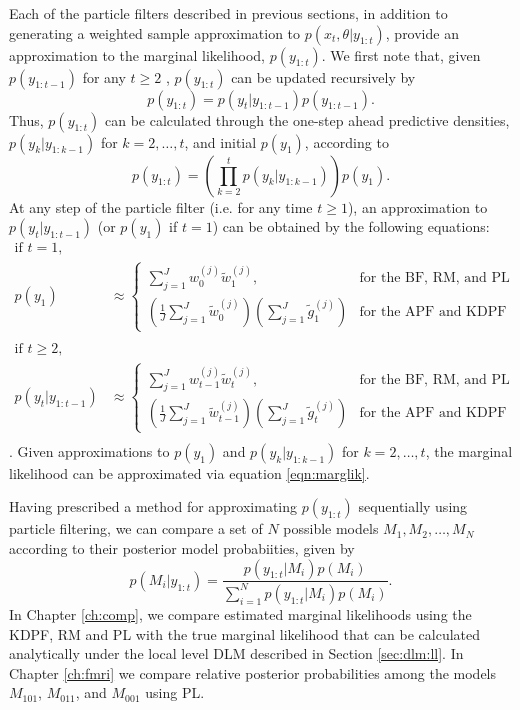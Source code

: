 Each of the particle filters described in previous sections, in addition to generating a weighted sample approximation to $p(x_t,\theta|y_{1:t})$, provide an approximation to the marginal likelihood, $p(y_{1:t})$. We first note that, given $p(y_{1:t-1})$ for any $t \ge 2$ , $p(y_{1:t})$ can be updated recursively by
\begin{equation}
p(y_{1:t}) = p(y_t|y_{1:t-1})p(y_{1:t-1}). \label{eqn:marglik:recurse}
\end{equation}
Thus, $p(y_{1:t})$ can be calculated through the one-step ahead predictive densities, $p(y_k|y_{1:k-1})$ for $k=2,\ldots,t$, and initial $p(y_1)$, according to
\begin{equation}
p(y_{1:t}) = \left(\prod_{k=2}^t p(y_k|y_{1:k-1})\right)p(y_1). \label{eqn:marglik}
\end{equation}
At any step of the particle filter (i.e. for any time $t \ge 1$), an approximation to $p(y_t|y_{1:t-1})$ (or $p(y_1)$ if $t = 1$) can be obtained by the following equations:
\begin{align}
\mbox{if } t = 1, & \nonumber \\
p(y_1) &\approx \left\{\begin{array}{ll} \sum_{j=1}^J w^{(j)}_{0}\tilde{w}^{(j)}_1, & \mbox{for the BF, RM, and PL} \\ \left(\frac{1}{J}\sum_{j=1}^J \tilde{w}^{(j)}_{0}\right)\left(\sum_{j=1}^J\tilde{g}^{(j)}_1\right) & \mbox{for the APF and KDPF} \end{array} \right. \label{eqn:onestep:pf:init} \\
 & \nonumber \\
\mbox{if } t \ge 2, & \nonumber \\
p(y_t|y_{1:t-1}) &\approx \left\{\begin{array}{ll} \sum_{j=1}^J w^{(j)}_{t-1}\tilde{w}^{(j)}_t, & \mbox{for the BF, RM, and PL} \\ \left(\frac{1}{J}\sum_{j=1}^J \tilde{w}^{(j)}_{t-1}\right)\left(\sum_{j=1}^J\tilde{g}^{(j)}_t\right) & \mbox{for the APF and KDPF} \end{array} \right. \label{eqn:onestep:pf} \\
 & \nonumber
\end{align}
\cite[Section 4.2][]{douc:joh:tut:2009}. Given approximations to $p(y_1)$ and $p(y_k|y_{1:k-1})$ for $k = 2,\ldots,t$, the marginal likelihood can be approximated via equation \eqref{eqn:marglik}.

Having prescribed a method for approximating $p(y_{1:t})$ sequentially using particle filtering, we can compare a set of $N$ possible models ${M_1,M_2,\ldots,M_N}$ according to their posterior model probabiities, given by
\begin{equation}
p(M_i|y_{1:t}) = \frac{p(y_{1:t}|M_i)p(M_i)}{\sum_{i=1}^N p(y_{1:t}|M_i)p(M_i)}. \label{eqn:modelcomp}
\end{equation}
In Chapter \ref{ch:comp}, we compare estimated marginal likelihoods using the KDPF, RM and PL with the true marginal likelihood that can be calculated analytically under the local level DLM described in Section \ref{sec:dlm:ll}. In Chapter \ref{ch:fmri} we compare relative posterior probabilities among the models $M_{101}$, $M_{011}$, and $M_{001}$ using PL.

